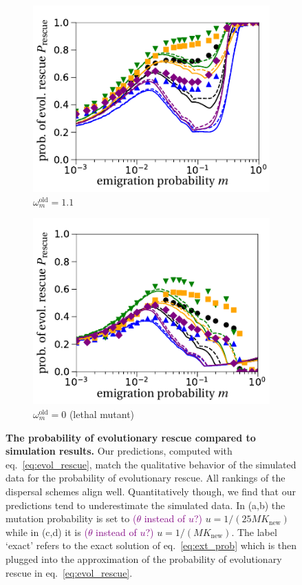 \documentclass[11pt]{article}
\newcommand{\florence}[1]{\textcolor{purple}{(#1)}} %
\begin{document}
\begin{figure}[t!]
\begin{subfigure}{.5\textwidth}
  		\centering
  		\includegraphics[width=\linewidth]{fig5c.pdf}
  		\caption{$\omega^\text{old}_m=1.1$}
  		\label{fig:rescue_1}
	\end{subfigure}%
	\begin{subfigure}{.5\textwidth}
  		\centering
  		\includegraphics[width=\linewidth]{fig5d.pdf}
  		\caption{$\omega^\text{old}_m=0$ (lethal mutant)}
  		\label{fig:rescue_lethal}
	\end{subfigure}
	\caption{\textbf{The probability of evolutionary rescue compared to simulation results.} \small Our predictions, computed with eq.~\eqref{eq:evol_rescue}, match the qualitative behavior of the simulated data for the probability of evolutionary rescue. All rankings of the dispersal schemes align well. Quantitatively though, we find that our predictions tend to underestimate the simulated data. In (a,b) the mutation probability is set to \florence{$\theta$ instead of $u$?} $u=1/(25MK_{\text{new}})$ while in (c,d) it is \florence{$\theta$ instead of $u$?} $u=1/(MK_{\text{new}})$. The label `exact' refers to the exact solution of eq.~\eqref{eq:ext_prob} which is then plugged into the approximation of the probability of evolutionary rescue in eq.~\eqref{eq:evol_rescue}.}
	\label{fig:rescue}
\end{figure}
\end{document}
